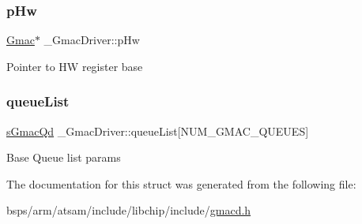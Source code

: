 \subsubsection{\texorpdfstring{pHw}{pHw}}
{\footnotesize\ttfamily \mbox{\hyperlink{structGmac}{Gmac}}$\ast$ \+\_\+\+Gmac\+Driver\+::p\+Hw}

Pointer to HW register base \mbox{\label{struct__GmacDriver_a177d53cc7fff8c5372c98188ea49c164}} 
\subsubsection{\texorpdfstring{queueList}{queueList}}
{\footnotesize\ttfamily \mbox{\hyperlink{group__gmacd__types_gaf703cfd044c83739379ae7ce3b9cbac5}{s\+Gmac\+Qd}} \+\_\+\+Gmac\+Driver\+::queue\+List\mbox{[}N\+U\+M\+\_\+\+G\+M\+A\+C\+\_\+\+Q\+U\+E\+U\+ES\mbox{]}}

Base Queue list params 

The documentation for this struct was generated from the following file\+:\begin{DoxyCompactItemize}
\item 
bsps/arm/atsam/include/libchip/include/\mbox{\hyperlink{gmacd_8h}{gmacd.\+h}}\end{DoxyCompactItemize}
